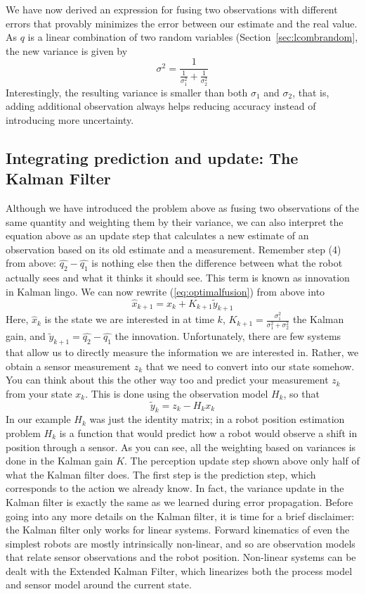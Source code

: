 We have now derived an expression for fusing two observations with different errors that provably minimizes the error between our estimate and the real value. As $q$ is a linear combination of two random variables (Section~\ref{sec:lcombrandom}, the new variance is given by
\begin{equation}
\sigma^2=\frac{1}{\frac{1}{\sigma_1^2}+\frac{1}{\sigma_2^2}}
\end{equation}
Interestingly, the resulting variance is smaller than both $\sigma_1$ and $\sigma_2$, that is, adding additional observation always helps  reducing accuracy instead of introducing more uncertainty.

\subsection{Integrating prediction and update: The Kalman Filter}
Although we have introduced the problem above as fusing two observations of the same quantity and weighting them by their variance, we can also interpret the equation above as an update step that calculates a new estimate of an observation based on its old estimate and a measurement. Remember step (4) from above: $ \hat{q_2}-\hat{q_1}$ is nothing else then the difference between what the robot actually sees and what it thinks it should see. This term is known as innovation in Kalman lingo. We can now
rewrite (\ref{eq:optimalfusion}) from above into
\begin{equation}
\hat{x}_{k+1}=\hat{x}_k+K_{k+1}\tilde{y}_{k+1}
\end{equation}
Here, $ \hat{x}_k$ is the state we are interested in at time $ k$, $ K_{k+1}=\frac{\sigma_1^2}{\sigma_1^2+\sigma_2^2}$ the Kalman gain, and $ \tilde{y}_{k+1}=\hat{q_2}-\hat{q_1}$  the innovation. Unfortunately, there are few systems that allow us to directly measure the information we are interested in. Rather, we obtain a sensor measurement $ z_k$ that we need to convert into our state somehow. You can think about this the other way too and predict your measurement $ z_k$ from your state $ x_k$. This is done using the observation model $ H_k$, so that
\begin{equation}
\tilde{y}_{k}=z_k-H_k x_k
\end{equation}
In our example $ H_k$ was just the identity matrix; in a robot position estimation problem $ H_k$ is a function that would predict how a robot would observe a shift in position through a sensor. As you can see, all the weighting based on variances is done in the Kalman gain $ K$.
The perception update step shown above only half of what the Kalman filter does. The first step is the prediction step, which corresponds to the action we already know. In fact, the variance update in the Kalman filter is exactly the same as we learned during error propagation. Before going into any more details on the Kalman filter, it is time for a brief disclaimer: the Kalman filter only works for linear systems. Forward kinematics of even the simplest robots are mostly intrinsically non-linear, and so are observation models that relate sensor observations and the robot position. Non-linear systems can be dealt with the Extended Kalman Filter, which linearizes both the process model and sensor model around the current state.

